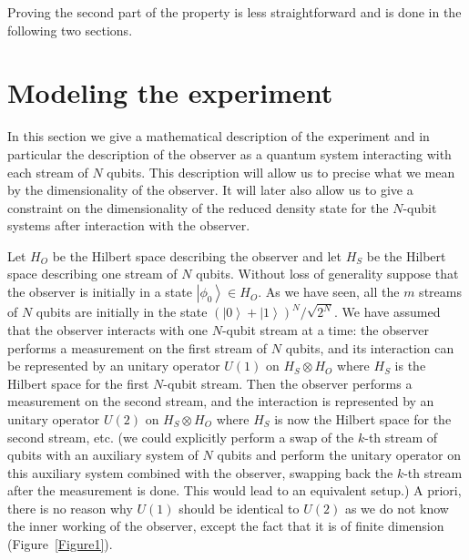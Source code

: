 \documentclass[11pt,amsmath,amssymb,latexsym,a4paper]{article}
\newcommand{\ket}[1]{\left|{#1}\right>}
\newcommand{\highlight}[1] {#1}
\begin{document}
Proving the second part of the property is less straightforward and is done in the following two sections.

\section{Modeling the experiment}

In this section we give a mathematical description of the experiment and in particular the description of the observer as a quantum system interacting with each stream of $N$ qubits. This description will allow us to precise what we mean by the dimensionality of the observer. It will later also allow us to give a constraint on the dimensionality of the reduced density state for the $N$-qubit systems after interaction with the observer.

Let $H_O$ be the Hilbert space describing the observer and let $H_S$ be the Hilbert space describing one stream of $N$ qubits. Without loss of generality suppose that the observer is initially in a state $\ket{\phi_0}\in H_O$. As we have seen, all the $m$ streams of $N$ qubits are initially in the state $(\ket{0}+\ket{1})^N/\sqrt{2^N}$. \highlight{We have assumed that the observer interacts with one $N$-qubit stream at a time:} the observer performs a measurement on the first stream of $N$ qubits, and its interaction can be represented by an unitary operator $U(1)$ on $H_S\otimes H_O$ where $H_S$ is the Hilbert space for the first $N$-qubit stream. Then the observer performs a measurement on the second stream, and the interaction is represented by an unitary operator $U(2)$ on $H_S\otimes H_O$ where $H_S$ is now the Hilbert space for the second stream, etc. \highlight{(we could explicitly perform a swap of the $k$-th stream of qubits with an auxiliary system of $N$ qubits and perform the unitary operator on this auxiliary system combined with the observer, swapping back the $k$-th stream after the measurement is done. This would lead to an equivalent setup.)} A priori, there is no reason why $U(1)$ should be identical to $U(2)$ as we do not know the inner working of the observer, except the fact that it is of finite dimension (Figure~\ref{Figure1}).
\end{document}
